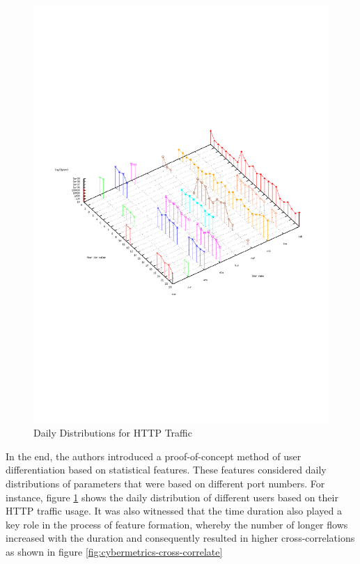\begin{figure}[h!]
\begin{center}
  \includegraphics* [width=0.6\linewidth]{figures/cybermetrics-daily-distrib}
  \caption{Daily Distributions for HTTP Traffic \cite{nmelnikov:thesis:2010}}
  \label{fig:cybermetrics-daily-distrib}
\end{center}
\end{figure}
In the end, the authors introduced a proof-of-concept method of user differentiation based on statistical features. These features considered daily distributions of parameters that were based on different port numbers. For instance, figure \ref{fig:cybermetrics-daily-distrib} shows the daily distribution of different users based on their \ac{HTTP} traffic usage. It was also witnessed that the time duration also played a key role in the process of feature formation, whereby the number of longer flows increased with the duration and consequently resulted in higher cross-correlations as shown in figure \ref{fig:cybermetrics-cross-correlate}
